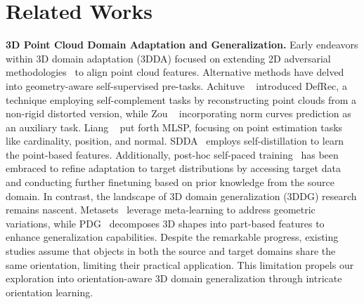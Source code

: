 \section{Related Works}
\noindent\textbf{3D Point Cloud Domain Adaptation and Generalization.}
Early endeavors within 3D domain adaptation (3DDA) focused on extending 2D adversarial methodologies~\cite{qin2019pointdan} to align point cloud features. Alternative methods have delved into geometry-aware self-supervised pre-tasks. Achituve \etal~\cite{achituve2021self} introduced DefRec, a technique employing self-complement tasks by reconstructing point clouds from a non-rigid distorted version, while Zou \etal~\cite{zou2021geometry} incorporating norm curves prediction as an auxiliary task. Liang \etal~\cite{liang2022point} put forth MLSP, focusing on point estimation tasks like cardinality, position, and normal. SDDA~\cite{cardace2023self} employs self-distillation to learn the point-based features. Additionally, post-hoc self-paced training~\cite{zou2021geometry,fan2022self,park2023pcadapter} has been embraced to refine adaptation to target distributions by accessing target data and conducting further finetuning based on prior knowledge from the source domain.
In contrast, the landscape of 3D domain generalization (3DDG) research remains nascent. Metasets~\cite{huang2021metasets} leverage meta-learning to address geometric variations, while PDG~\cite{wei2022learning} decomposes 3D shapes into part-based features to enhance generalization capabilities.
Despite the remarkable progress, existing studies assume that objects in both the source and target domains share the same orientation, limiting their practical application. This limitation propels our exploration into orientation-aware 3D domain generalization through intricate orientation learning.


